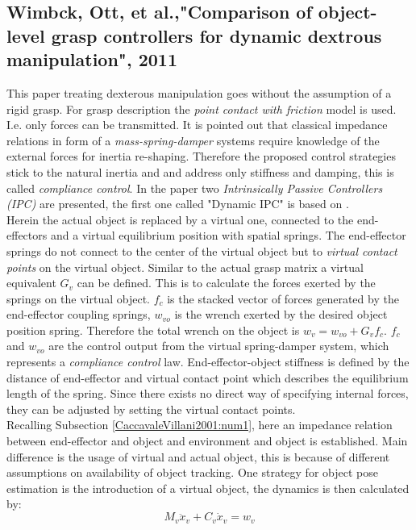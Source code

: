 \documentclass[conference]{IEEEtran}
\begin{document}
\subsection{Wimbck, Ott, et al.,"Comparison of object-level grasp controllers for dynamic dextrous manipulation", 2011}
This paper treating dexterous manipulation goes without the assumption of a rigid grasp. For grasp description the \textit{point contact with friction }model is used. I.e. only forces can be transmitted. It is pointed out that classical impedance relations in form of a \textit{mass-spring-damper} systems require knowledge of the external forces for inertia re-shaping. Therefore the proposed control strategies stick to the natural inertia and and address only stiffness and damping, this is called \textit{compliance control}. In the paper two \textit{Intrinsically Passive Controllers (IPC)} are presented, the first one called "Dynamic IPC" is based on \cite{Stramigioli2001}.\\
Herein the actual object is replaced by a virtual one, connected to the end-effectors and a virtual equilibrium position with spatial springs. The end-effector springs do not connect to the center of the virtual object but to \textit{virtual contact points} on the virtual object. Similar to the actual grasp matrix a virtual equivalent $ G_v $ can be defined. This is to calculate the forces exerted by the springs on the virtual object. $ f_c $ is the stacked vector of forces generated by the end-effector coupling springs, $ w_{vo} $ is the wrench exerted by the desired object position spring. Therefore the total wrench on the object is $ w_v = w_{vo} + G_vf_c $. $ f_c $ and $ w_{vo} $ are the control output from the  virtual spring-damper system, which represents a \textit{compliance control} law. End-effector-object stiffness is defined by the distance of end-effector and virtual contact point which describes the equilibrium length of the spring. Since there exists no direct way of specifying internal forces, they can be adjusted by setting the virtual contact points.\\  Recalling Subsection \ref{CaccavaleVillani2001:num1}, here an impedance relation between end-effector and object and environment and object is established. Main difference is the usage of virtual and actual object, this is because of different assumptions on availability of object tracking. One strategy for object pose estimation is the introduction of a virtual object, the dynamics is then calculated by:
\begin{equation}
M_v\ddot{x}_v + C_v\dot{x}_v = w_v
\end{equation}
\end{document}
